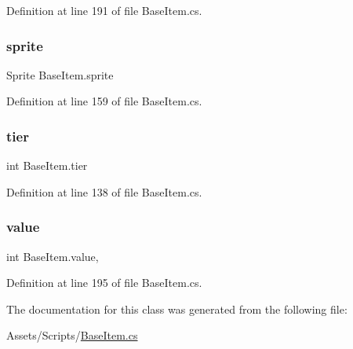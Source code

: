 Definition at line 191 of file Base\+Item.\+cs.

\mbox{\label{class_base_item_a094da300c07c477d11e4e21d7d482d71}} 
\subsubsection{\texorpdfstring{sprite}{sprite}}
{\footnotesize\ttfamily Sprite Base\+Item.\+sprite\hspace{0.3cm}{\ttfamily [get]}}



Definition at line 159 of file Base\+Item.\+cs.

\mbox{\label{class_base_item_a678360458ab8a81628c85383def99dce}} 
\subsubsection{\texorpdfstring{tier}{tier}}
{\footnotesize\ttfamily int Base\+Item.\+tier\hspace{0.3cm}{\ttfamily [get]}}



Definition at line 138 of file Base\+Item.\+cs.

\mbox{\label{class_base_item_ac246c2f3f1b1b6e3cae9bef5c26268a2}} 
\subsubsection{\texorpdfstring{value}{value}}
{\footnotesize\ttfamily int Base\+Item.\+value\hspace{0.3cm}{\ttfamily [get]}, {\ttfamily [set]}}



Definition at line 195 of file Base\+Item.\+cs.



The documentation for this class was generated from the following file\+:\begin{DoxyCompactItemize}
\item 
Assets/\+Scripts/\mbox{\hyperlink{_base_item_8cs}{Base\+Item.\+cs}}\end{DoxyCompactItemize}
